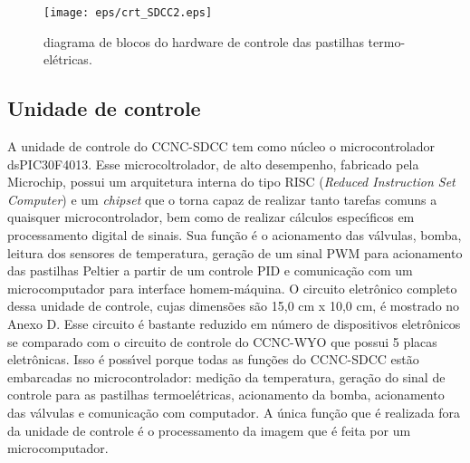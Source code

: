 \begin{figure}[!hbt]
\begin{center}
\texttt{[image: eps/crt\_SDCC2.eps]}\\
\end{center}
\caption{\label{crt_SDCC}\hspace{-0.1em} diagrama de blocos do hardware de controle das pastilhas termo-el\'{e}tricas.}
\end{figure}

\newpage
\subsection{Unidade de controle}

A unidade de controle do CCNC-SDCC tem como n\'{u}cleo o microcontrolador dsPIC30F4013.  Esse microcoltrolador, de alto desempenho, fabricado pela Microchip, possui um arquitetura interna do tipo RISC (\emph{Reduced Instruction Set Computer}) e um \emph{chipset} que o torna capaz de realizar tanto tarefas comuns a quaisquer microcontrolador, bem como de realizar c\'{a}lculos espec\'{\i}ficos em processamento digital de sinais. Sua fun\c{c}\~{a}o \'{e} o acionamento das v\'{a}lvulas, bomba, leitura dos sensores de temperatura, gera\c{c}\~{a}o de um sinal PWM para acionamento das pastilhas Peltier a partir de um controle PID e comunica\c{c}\~{a}o com um microcomputador para interface homem-m\'{a}quina. O circuito eletr\^{o}nico completo dessa unidade de controle, cujas dimens\~{o}es s\~{a}o 15,0 cm x 10,0 cm, \'{e} mostrado no Anexo D. Esse circuito \'{e} bastante reduzido em n\'{u}mero de dispositivos eletr\^{o}nicos se comparado com o circuito de controle do CCNC-WYO que possui 5 placas eletr\^{o}nicas. Isso \'{e} poss\'{\i}vel porque todas as fun\c{c}\~{o}es do CCNC-SDCC est\~{a}o embarcadas no microcontrolador: medi\c{c}\~{a}o da temperatura, gera\c{c}\~{a}o do sinal de controle para as pastilhas termoel\'{e}tricas, acionamento da bomba, acionamento das v\'{a}lvulas e comunica\c{c}\~{a}o com computador. A \'{u}nica fun\c{c}\~{a}o que \'{e} realizada fora da unidade de controle \'{e} o processamento da imagem que \'{e} feita por um microcomputador.



